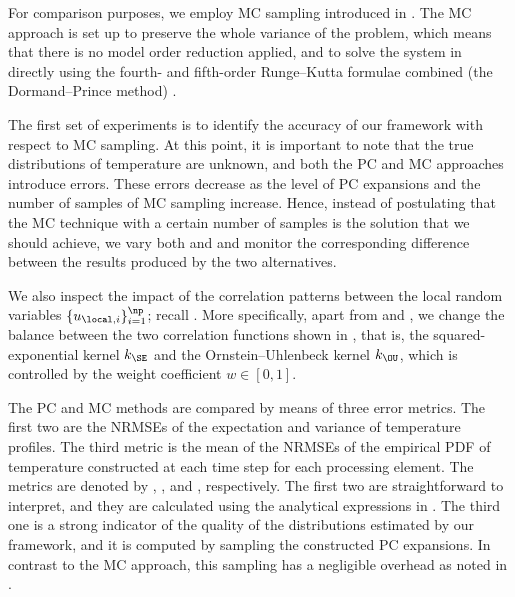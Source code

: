 For comparison purposes, we employ \ac{MC} sampling introduced in .
The \ac{MC} approach is set up to preserve the whole variance of the problem,
which means that there is no model order reduction applied, and to solve the
system in  directly using the fourth- and
fifth-order Runge--Kutta formulae combined (the Dormand--Prince method)
\cite{press2007}.


The first set of experiments is to identify the accuracy of our framework with
respect to \ac{MC} sampling. At this point, it is important to note that the
true distributions of temperature are unknown, and both the \ac{PC} and \ac{MC}
approaches introduce errors. These errors decrease as the level \lc of \ac{PC}
expansions and the number of samples \no of \ac{MC} sampling increase. Hence,
instead of postulating that the \ac{MC} technique with a certain number of
samples is the solution that we should achieve, we vary both \lc and \no and
monitor the corresponding difference between the results produced by the two
alternatives.

We also inspect the impact of the correlation patterns between the local random
variables $\{ u_{\local, i} \}_{i = 1}^\np$; recall
. More specifically, apart from \lc and \no,
we change the balance between the two correlation functions shown in
, that is, the squared-exponential kernel $k_\SE$ and
the Ornstein--Uhlenbeck kernel $k_\OU$, which is controlled by the weight
coefficient $w \in [0, 1]$.

The \ac{PC} and \ac{MC} methods are compared by means of three error metrics.
The first two are the \acp{NRMSE} of the expectation and variance of temperature
profiles. The third metric is the mean of the \acp{NRMSE} of the empirical
\ac{PDF} of temperature constructed at each time step for each processing
element. The metrics are denoted by \error{\expectation}, \error{\variance}, and
, respectively. The first two are straightforward to interpret, and
they are calculated using the analytical expressions in .
The third one is a strong indicator of the quality of the distributions
estimated by our framework, and it is computed by sampling the constructed
\ac{PC} expansions. In contrast to the \ac{MC} approach, this sampling has a
negligible overhead as noted in .

